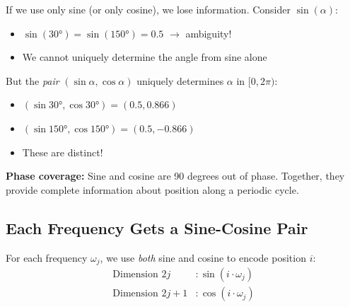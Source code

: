 \documentclass{article}
\begin{document}
If we use only sine (or only cosine), we lose information. Consider $\sin(\alpha)$:
\begin{itemize}
\item $\sin(30°) = \sin(150°) = 0.5$ $\rightarrow$ ambiguity!
\item We cannot uniquely determine the angle from sine alone
\end{itemize}

But the \emph{pair} $(\sin\alpha, \cos\alpha)$ uniquely determines $\alpha$ in $[0, 2\pi)$:
\begin{itemize}
\item $(\sin 30°, \cos 30°) = (0.5, 0.866)$
\item $(\sin 150°, \cos 150°) = (0.5, -0.866)$
\item These are distinct!
\end{itemize}

\textbf{Phase coverage:} Sine and cosine are 90 degrees out of phase. Together, they provide complete information about position along a periodic cycle.

\begin{center}
\end{center}

\subsection{Each Frequency Gets a Sine-Cosine Pair}

For each frequency $\omega_j$, we use \emph{both} sine and cosine to encode position $i$:
\begin{align}
\text{Dimension } 2j &: \sin(i \cdot \omega_j) \\
\text{Dimension } 2j+1 &: \cos(i \cdot \omega_j)
\end{align}
\end{document}
